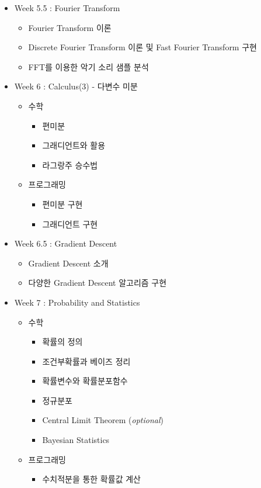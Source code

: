 \documentclass[11pt, a4paper]{article}
\begin{document}
\begin{center}
\begin{flushleft}
\begin{itemize}
\item Week 5.5 : Fourier Transform 
\begin{itemize} 
\item Fourier Transform 이론 
\item Discrete Fourier Transform 이론 및 Fast Fourier Transform 구현 
\item FFT를 이용한 악기 소리 샘플 분석 
\end{itemize}

\item Week 6 : Calculus(3) - 다변수 미분

\begin{itemize} 
\item 수학 
\begin{itemize}
\item 편미분 
\item 그래디언트와 활용 
\item 라그랑주 승수법 
\end{itemize} 
\item 프로그래밍 
\begin{itemize} 
\item 편미분 구현 
\item 그래디언트 구현 
\end{itemize} 
\end{itemize}

\item Week 6.5 : Gradient Descent 
\begin{itemize} 
\item Gradient Descent 소개 
\item 다양한 Gradient Descent 알고리즘 구현 
\end{itemize}


\item Week 7 : Probability and Statistics

\begin{itemize} 
\item 수학 
\begin{itemize}
\item 확률의 정의  
\item 조건부확률과 베이즈 정리 
\item 확률변수와 확률분포함수
\item 정규분포
\item Central Limit Theorem (\textit{optional})
\item Bayesian Statistics 
\end{itemize} 
\item 프로그래밍 
\begin{itemize} 
\item 수치적분을 통한 확률값 계산 
\end{itemize} 
\end{itemize}


\end{itemize}
\end{flushleft}
\end{center}
\end{document}
